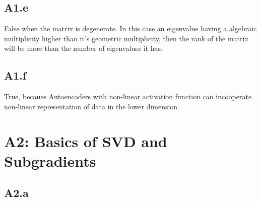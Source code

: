 \documentclass[]{article}
\begin{document}
    \subsection*{A1.e}
        False when the matrix is degenerate. In this case an eigenvalue having a algebraic multiplicity higher than it's geometric multiplicity, then the rank of the matrix will be more than the number of eigenvalues it has. 
    \subsection*{A1.f}
        True, becaues Autoencoders with non-linear activation function can incooperate non-linear representation of data in the lower dimension. 
        
    
\section*{A2: Basics of SVD and Subgradients}
    \subsection*{A2.a}
\end{document}

